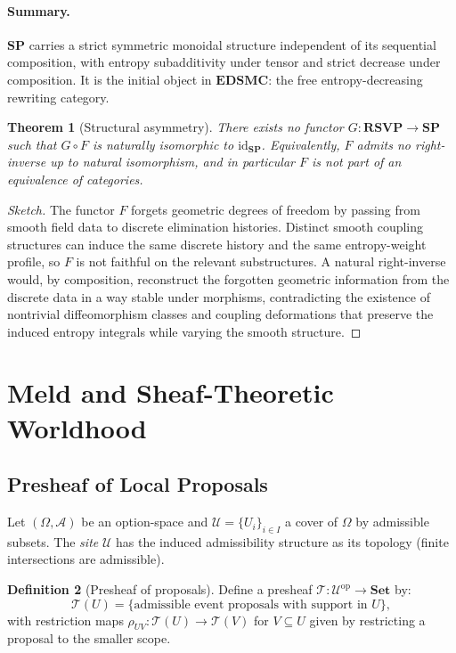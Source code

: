 \documentclass[12pt,a4paper]{article}
\newtheorem{theorem}{Theorem}[section]
\theoremstyle{definition}
\newtheorem{definition}[theorem]{Definition}
\theoremstyle{remark}
\newcommand{\SP}{\mathbf{SP}}
\newcommand{\RSVP}{\mathbf{RSVP}}
\newcommand{\EDSMC}{\mathbf{EDSMC}}
\begin{document}
\paragraph{Summary.} $\SP$ carries a strict symmetric monoidal structure independent
of its sequential composition, with entropy subadditivity under tensor and strict
decrease under composition. It is the initial object in $\EDSMC$: the free
entropy-decreasing rewriting category.

\begin{theorem}[Structural asymmetry]
There exists no functor $G:\RSVP\to\SP$ such that $G\circ F$ is naturally isomorphic to $\mathrm{id}_\SP$. Equivalently, $F$ admits no right-inverse up to natural isomorphism, and in particular $F$ is not part of an equivalence of categories.
\end{theorem}

\begin{proof}[Sketch]
The functor $F$ forgets geometric degrees of freedom by passing from smooth field data to discrete elimination histories. Distinct smooth coupling structures can induce the same discrete history and the same entropy-weight profile, so $F$ is not faithful on the relevant substructures. A natural right-inverse would, by composition, reconstruct the forgotten geometric information from the discrete data in a way stable under morphisms, contradicting the existence of nontrivial diffeomorphism classes and coupling deformations that preserve the induced entropy integrals while varying the smooth structure.
\end{proof}

\section{Meld and Sheaf-Theoretic Worldhood}
\label{sec:sheaf}

\subsection{Presheaf of Local Proposals}

Let $(\Omega,\mathcal{A})$ be an option-space and $\mathcal{U}=\{U_i\}_{i\in I}$ a
cover of $\Omega$ by admissible subsets. The \emph{site} $\mathcal{U}$ has the
induced admissibility structure as its topology (finite intersections are admissible).

\begin{definition}[Presheaf of proposals]
\label{def:presheaf}
Define a presheaf $\mathcal{T}:\mathcal{U}^{\mathrm{op}}\to\mathbf{Set}$ by:
\[
  \mathcal{T}(U) = \{\text{admissible event proposals with support in }U\},
\]
with restriction maps $\rho_{UV}:\mathcal{T}(U)\to\mathcal{T}(V)$ for $V\subseteq U$
given by restricting a proposal to the smaller scope.
\end{definition}
\end{document}
